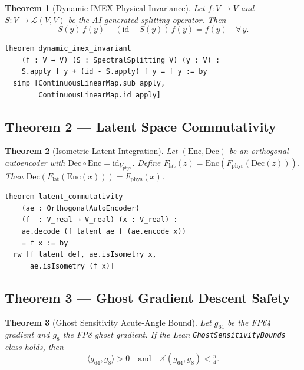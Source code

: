 \documentclass[11pt,twocolumn]{article}
\newtheorem{theorem}{Theorem}[section]
\begin{document}
\begin{theorem}[Dynamic IMEX Physical Invariance]
Let $f: V\to V$ and $S: V\to\mathcal{L}(V,V)$ be the AI-generated
splitting operator. Then
\[
  S(y)\,f(y) + (\mathrm{id} - S(y))\,f(y) = f(y) \quad \forall\,y.
\]
\end{theorem}

\begin{lstlisting}[language=Lean4,caption={Lean 4 proof of IMEX invariance}]
theorem dynamic_imex_invariant
    (f : V → V) (S : SpectralSplitting V) (y : V) :
    S.apply f y + (id - S.apply) f y = f y := by
  simp [ContinuousLinearMap.sub_apply,
        ContinuousLinearMap.id_apply]
\end{lstlisting}

\subsection{Theorem 2 — Latent Space Commutativity}

\begin{theorem}[Isometric Latent Integration]
Let $(\mathrm{Enc},\mathrm{Dec})$ be an orthogonal autoencoder with
$\mathrm{Dec}\circ\mathrm{Enc} = \mathrm{id}_{V_{\mathrm{phys}}}$.
Define $F_{\mathrm{lat}}(z)=\mathrm{Enc}(F_{\mathrm{phys}}(\mathrm{Dec}(z)))$.
Then $\mathrm{Dec}(F_{\mathrm{lat}}(\mathrm{Enc}(x))) = F_{\mathrm{phys}}(x)$.
\end{theorem}

\begin{lstlisting}[language=Lean4,caption={Lean 4 commutativity proof}]
theorem latent_commutativity
    (ae : OrthogonalAutoEncoder)
    (f  : V_real → V_real) (x : V_real) :
    ae.decode (f_latent ae f (ae.encode x))
    = f x := by
  rw [f_latent_def, ae.isIsometry x,
      ae.isIsometry (f x)]
\end{lstlisting}

\subsection{Theorem 3 — Ghost Gradient Descent Safety}

\begin{theorem}[Ghost Sensitivity Acute-Angle Bound]
Let $g_{64}$ be the FP64 gradient and $g_8$ the FP8 ghost gradient.
If the Lean \texttt{GhostSensitivityBounds} class holds, then
\[
  \langle g_{64}, g_8\rangle > 0 \quad\text{and}\quad
  \measuredangle(g_{64},g_8) < \tfrac{\pi}{4}.
\]
\end{theorem}
\end{document}
